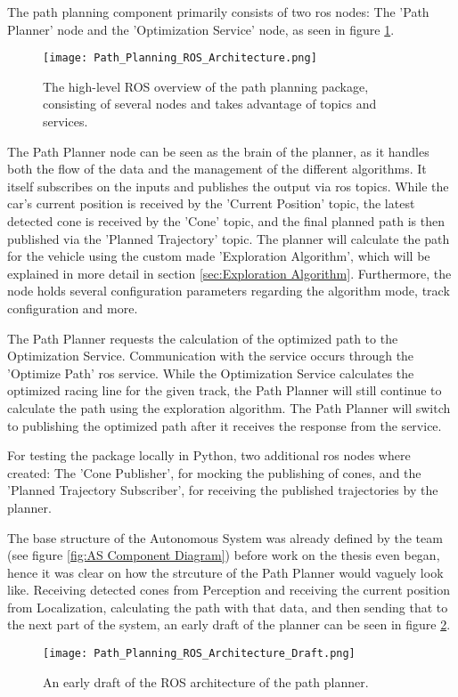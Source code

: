 The path planning component primarily consists of two \acrshort{ros} nodes: The 'Path Planner' node and the 'Optimization Service' node, as seen in figure \ref{fig:Path Planning ROS Architecture}.
\begin{figure}[H]
    \centering
    \texttt{[image: Path\_Planning\_ROS\_Architecture.png]}
    \caption{The high-level ROS overview of the path planning package, consisting of several nodes and takes advantage of topics and services.}
    \label{fig:Path Planning ROS Architecture}
\end{figure}

The Path Planner node can be seen as the brain of the planner, as it handles both the flow of the data and the management of the different algorithms. It itself subscribes on the inputs and publishes the output via \acrshort{ros} topics. While the car's current position is received by the 'Current Position' topic, the latest detected cone is received by the 'Cone' topic, and the final planned path is then published via the 'Planned Trajectory' topic. The planner will calculate the path for the vehicle using the custom made 'Exploration Algorithm', which will be explained in more detail in section \ref{sec:Exploration Algorithm}. Furthermore, the node holds several configuration parameters regarding the algorithm mode, track configuration and more.

The Path Planner requests the calculation of the optimized path to the Optimization Service. Communication with the service occurs through the 'Optimize Path' \acrshort{ros} service. While the Optimization Service calculates the optimized racing line for the given track, the Path Planner will still continue to calculate the path using the exploration algorithm. The Path Planner will switch to publishing the optimized path after it receives the response from the service.

For testing the package locally in Python, two additional \acrshort{ros} nodes where created: The 'Cone Publisher', for mocking the publishing of cones, and the 'Planned Trajectory Subscriber', for receiving the published trajectories by the planner.

The base structure of the Autonomous System was already defined by the team (see figure \ref{fig:AS Component Diagram}) before work on the thesis even began, hence it was clear on how the strcuture of the Path Planner would vaguely look like. Receiving detected cones from Perception and receiving the current position from Localization, calculating the path with that data, and then sending that to the next part of the system, an early draft of the planner can be seen in figure \ref{fig:Path Planning ROS Architecture Draft}.
\begin{figure}[H]
    \centering
    \texttt{[image: Path\_Planning\_ROS\_Architecture\_Draft.png]}
    \caption{An early draft of the ROS architecture of the path planner.}
    \label{fig:Path Planning ROS Architecture Draft}
\end{figure}

